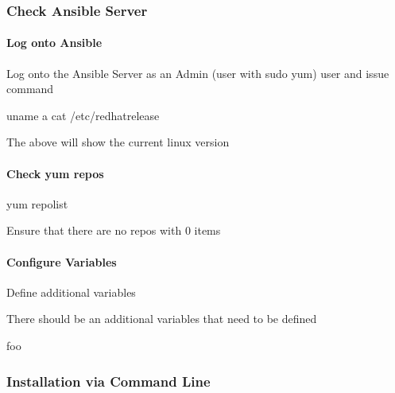 \documentclass[letterpaper,10pt,english]{sphinxmanual}
\begin{document}
\subsubsection{Check Ansible Server}
\label{\detokenize{install:check-ansible-server}}

\paragraph{Log onto Ansible}
\label{\detokenize{install:log-onto-ansible}}
\sphinxAtStartPar
Log onto the Ansible Server as an Admin (user with sudo yum) user and issue command

\begin{sphinxVerbatim}[commandchars=\\\{\}]
uname \PYGZhy{}a
cat /etc/redhat\PYGZhy{}release
\end{sphinxVerbatim}

\sphinxAtStartPar
The above will show the current linux version


\paragraph{Check yum repos}
\label{\detokenize{install:check-yum-repos}}
\begin{sphinxVerbatim}[commandchars=\\\{\}]
yum repolist
\end{sphinxVerbatim}

\sphinxAtStartPar
Ensure that there are no repos with 0 items


\paragraph{Configure Variables}
\label{\detokenize{install:configure-variables}}
\sphinxAtStartPar
Define additional variables

\sphinxAtStartPar
There should be an additional variables that need to be defined

\begin{sphinxVerbatim}[commandchars=\\\{\}]
 foo
\end{sphinxVerbatim}


\subsubsection{Installation via Command Line}
\label{\detokenize{install:installation-via-command-line}}
\end{document}
